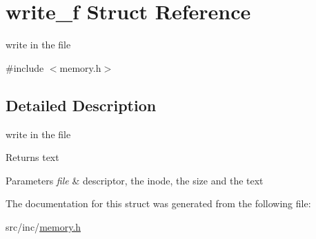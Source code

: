 \hypertarget{structwrite__f}{}\section{write\+\_\+f Struct Reference}
\label{structwrite__f}


write in the file  




{\ttfamily \#include $<$memory.\+h$>$}



\subsection{Detailed Description}
write in the file 

\begin{DoxyReturn}{Returns}
text 
\end{DoxyReturn}

\begin{DoxyParams}{Parameters}
{\em file} & descriptor, the inode, the size and the text \\
\hline
\end{DoxyParams}


The documentation for this struct was generated from the following file\+:\begin{DoxyCompactItemize}
\item 
src/inc/\mbox{\hyperlink{memory_8h}{memory.\+h}}\end{DoxyCompactItemize}

